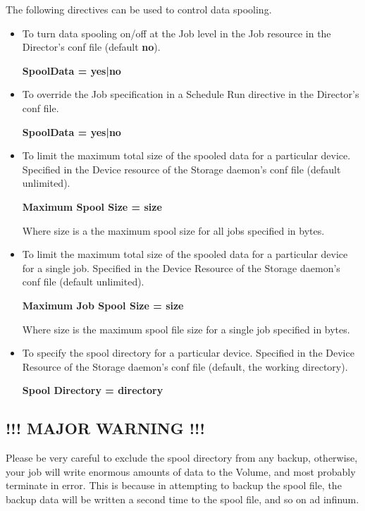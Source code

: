 The following directives can be used to control data spooling. 

\begin{itemize}
\item To turn data spooling on/off at the Job level in  the Job resource in
   the Director's conf file (default  {\bf no}).

{\bf SpoolData = yes|no} 
\item To override the Job specification in a Schedule Run  directive in the
   Director's conf file.

{\bf SpoolData = yes|no} 
\item To limit the maximum total size of the spooled data  for a particular
   device. Specified in the Device  resource of the Storage daemon's conf file
   (default  unlimited).

{\bf Maximum Spool Size = size}

Where size is a the maximum spool size for all jobs  specified in bytes. 
\item To limit the maximum total size of the spooled data  for a particular
   device for a single job. Specified  in the Device Resource of the Storage
   daemon's conf  file (default unlimited).

{\bf Maximum Job Spool Size = size}

Where size is the maximum spool file size for a single  job specified in
bytes. 
\item To specify the spool directory for a particular device.  Specified in
   the Device Resource of the Storage daemon's conf  file (default, the working
   directory).

{\bf Spool Directory = directory} 
\end{itemize}

\label{warning}

\subsection*{!!! MAJOR WARNING !!!}

Please be very careful to exclude the spool directory from any backup,
otherwise, your job will write enormous amounts of data to the Volume, and
most probably terminate in error. This is because in attempting to backup the
spool file, the backup data will be written a second time to the spool file,
and so on ad infinum. 

